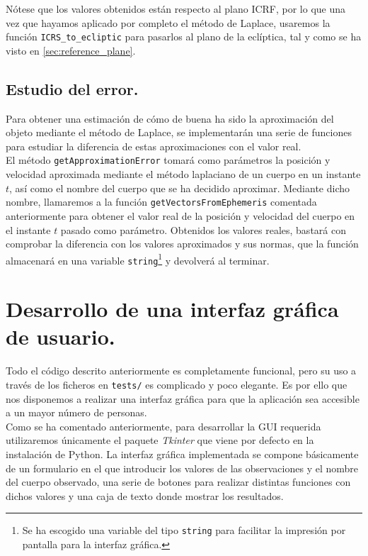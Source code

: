 Nótese que los valores obtenidos están respecto al plano ICRF, por lo que una vez que hayamos aplicado por completo el método de Laplace, usaremos la función \texttt{ICRS\_to\_ecliptic} para pasarlos al plano de la eclíptica, tal y como se ha visto en \ref{sec:reference_plane}.\\

\subsection{Estudio del error.}
Para obtener una estimación de cómo de buena ha sido la aproximación del objeto mediante el método de Laplace, se implementarán una serie de funciones para estudiar la diferencia de estas aproximaciones con el valor real.\\

El método \texttt{getApproximationError} tomará como parámetros la posición y velocidad aproximada mediante el método laplaciano de un cuerpo en un instante $t$, así como el nombre del cuerpo que se ha decidido aproximar. Mediante dicho nombre, llamaremos a la función \texttt{getVectorsFromEphemeris} comentada anteriormente para obtener el valor real de la posición y velocidad del cuerpo en el instante $t$ pasado como parámetro. Obtenidos los valores reales, bastará con comprobar la diferencia con los valores aproximados y sus normas, que la función almacenará en una variable \texttt{string}\footnote{Se ha escogido una variable del tipo \texttt{string} para facilitar la impresión por pantalla para la interfaz gráfica.} y devolverá al terminar.\\

\section{Desarrollo de una interfaz gráfica de usuario.}
Todo el código descrito anteriormente es completamente funcional, pero su uso a través de los ficheros en \texttt{tests/} es complicado y poco elegante. Es por ello que nos disponemos a realizar una interfaz gráfica para que la aplicación sea accesible a un mayor número de personas.\\

Como se ha comentado anteriormente, para desarrollar la GUI requerida utilizaremos únicamente el paquete \textit{Tkinter} que viene por defecto en la instalación de Python. La interfaz gráfica implementada se compone básicamente de un formulario en el que introducir los valores de las observaciones y el nombre del cuerpo observado, una serie de botones para realizar distintas funciones con dichos valores y una caja de texto donde mostrar los resultados.


